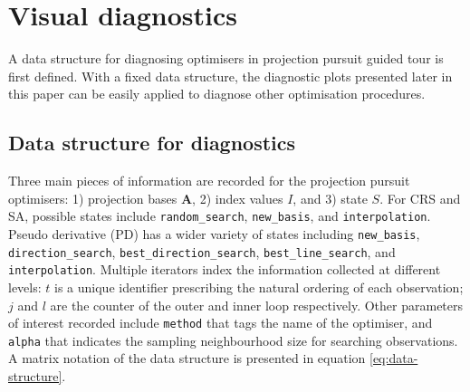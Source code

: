 \hypertarget{vis-diag}{%
\section{Visual diagnostics}\label{vis-diag}}

A data structure for diagnosing optimisers in projection pursuit guided
tour is first defined. With a fixed data structure, the diagnostic plots
presented later in this paper can be easily applied to diagnose other
optimisation procedures.

\hypertarget{data-structure-for-diagnostics}{%
\subsection{Data structure for
diagnostics}\label{data-structure-for-diagnostics}}

Three main pieces of information are recorded for the projection pursuit
optimisers: 1) projection bases \(\mathbf{A}\), 2) index values \(I\),
and 3) state \(S\). For CRS and SA, possible states include
\texttt{random\_search}, \texttt{new\_basis}, and
\texttt{interpolation}. Pseudo derivative (PD) has a wider variety of
states including \texttt{new\_basis}, \texttt{direction\_search},
\texttt{best\_direction\_search}, \texttt{best\_line\_search}, and
\texttt{interpolation}. Multiple iterators index the information
collected at different levels: \(t\) is a unique identifier prescribing
the natural ordering of each observation; \(j\) and \(l\) are the
counter of the outer and inner loop respectively. Other parameters of
interest recorded include \texttt{method} that tags the name of the
optimiser, and \texttt{alpha} that indicates the sampling neighbourhood
size for searching observations. A matrix notation of the data structure
is presented in equation \ref{eq:data-structure}.

